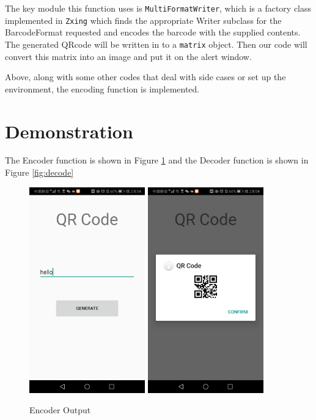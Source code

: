 The key module this function uses is \texttt{MultiFormatWriter}, which is a factory class implemented in \texttt{Zxing} which finds the appropriate Writer subclass for the BarcodeFormat requested and encodes the barcode with the supplied contents. The generated QRcode will be written in to a \texttt{matrix} object. Then our code will convert this matrix into an image and put it on the alert window.

Above, along with some other codes that deal with side cases or set up the environment, the encoding function is implemented.

\section{Demonstration}

The Encoder function is shown in Figure \ref{fig:encode} and the Decoder function is shown in Figure \ref{fig:decode}

\begin{figure}[hb]
  \begin{center}
  \includegraphics[width=5cm]{img/encode1.jpeg}
  \includegraphics[width=5cm]{img/encode2.jpeg}
  \caption{Encoder Output}
  \label{fig:encode}
  \end{center}
\end{figure}

